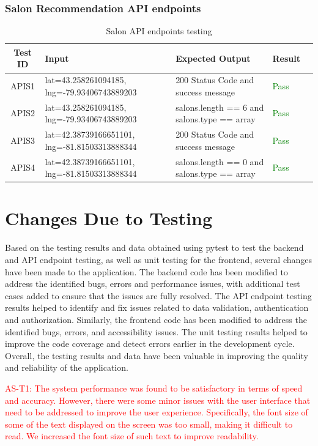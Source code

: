 \documentclass[12pt, titlepage]{article}
\begin{document}
\subsubsection{Salon Recommendation API endpoints}
\begin{table}[ht!]
\noindent
    \centering
    \begin{tabular}{|c|p{}|p{}|p{}|c|}
    \hline
        \textbf{Test ID} & \textbf{Input} & \textbf{Expected Output} & \textbf{Result} \\ \hline
        APIS1 & lat=43.258261094185, lng=-79.93406743889203 & 200 Status Code and success message & \textcolor{green}{Pass} \\ \hline
        APIS2 & lat=43.258261094185, lng=-79.93406743889203 & salons.length == 6 and salons.type == array & \textcolor{green}{Pass} \\ \hline
        APIS3 & lat=42.38739166651101, lng=-81.81503313888344 & 200 Status Code and success message & \textcolor{green}{Pass} \\ \hline
        APIS4 & lat=42.38739166651101, lng=-81.81503313888344 & salons.length == 0 and salons.type == array & \textcolor{green}{Pass} \\ \hline
    \end{tabular}
    \caption{Salon API endpoints testing}
\end{table}
\newpage
\section{Changes Due to Testing}
Based on the testing results and data obtained using pytest to test the backend and API endpoint testing, as well as unit testing for the frontend, several changes have been made to the application. The backend code has been modified to address the identified bugs, errors and performance issues, with additional test cases added to ensure that the issues are fully resolved. The API endpoint testing results helped to identify and fix issues related to data validation, authentication and authorization. Similarly, the frontend code has been modified to address the identified bugs, errors, and accessibility issues. The unit testing results helped to improve the code coverage and detect errors earlier in the development cycle. Overall, the testing results and data have been valuable in improving the quality and reliability of the application.

\textcolor{red}{AS-T1: The system performance was found to be satisfactory in terms of speed and accuracy. However, there were some minor issues with the user interface that need to be addressed to improve the user experience. Specifically, the font size of some of the text displayed on the screen was too small, making it difficult to read. We increased the font size of such text to improve readability.}
\end{document}
